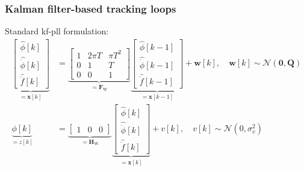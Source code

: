 \documentclass[
    hyperref={colorlinks,citecolor=DeepPink4,linkcolor=DarkRed,urlcolor=DarkBlue}
]{beamer_class}
\begin{document}
\begin{frame}[t]
	\frametitle{Kalman filter-based tracking loops}
    Standard \gls{kf}-\gls{pll} formulation:
	\begin{align}
     \underbrace{\begin{bmatrix}
        \hat{\phi} \left[ k \right] \\
        \hat{\dot{\phi}} \left[ k \right] \\
        \hat{\ddot{f}} \left[ k \right]
    \end{bmatrix}}_{= \mathbf{x} \left[ k \right]} & = \underbrace{\begin{bmatrix}
        1 & 2 \pi T & \pi T^2 \\
        0 & 1 & T \\
        0 & 0 & 1
    \end{bmatrix}}_{= \mathbf{F}_{\mathrm{W}}} \underbrace{\begin{bmatrix}
        \hat{\phi} \left[ k-1 \right] \\
        \hat{\dot{\phi}} \left[ k-1 \right] \\
        \hat{\ddot{f}} \left[ k-1 \right]
    \end{bmatrix}}_{= \mathbf{x} \left[ k-1 \right]} + \mathbf{w} \left[ k \right], \quad \mathbf{w} \left[ k \right] \sim \mathcal{N} \left( \mathbf{0}, \mathbf{Q} \right) \\
    \underbrace{\phi \left[ k \right]}_{= z \left[ k \right]} & = \underbrace{\begin{bmatrix}
        1 & 0 & 0
    \end{bmatrix}}_{= \mathbf{H}_{\mathrm{W}}} \underbrace{\begin{bmatrix}
        \hat{\phi} \left[ k \right] \\
        \hat{\dot{\phi}} \left[ k \right] \\
        \hat{\ddot{f}} \left[ k \right]
    \end{bmatrix}}_{= \mathbf{x} \left[ k \right]} + v \left[ k \right], \quad v \left[ k \right] \sim \mathcal{N} \left( 0, \sigma_{v}^{2} \right)
    \end{align}
\end{frame}
\end{document}
